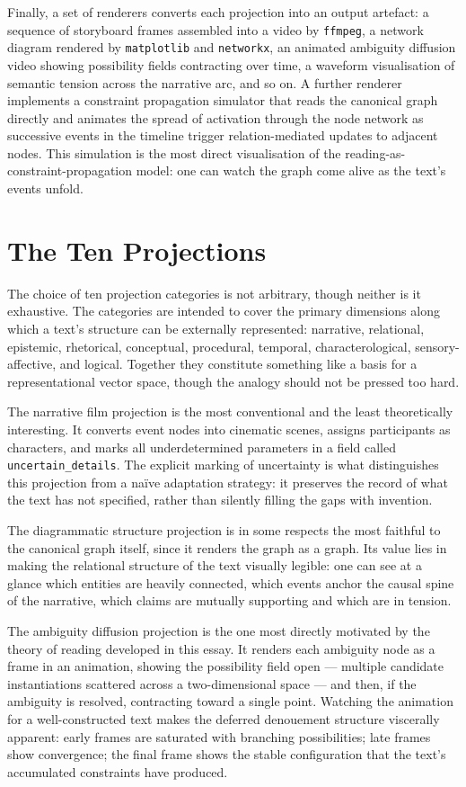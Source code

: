 \documentclass[12pt, a4paper]{article}
\begin{document}
Finally, a set of renderers converts each projection into an output artefact: a sequence of storyboard frames assembled into a video by \texttt{ffmpeg}, a network diagram rendered by \texttt{matplotlib} and \texttt{networkx}, an animated ambiguity diffusion video showing possibility fields contracting over time, a waveform visualisation of semantic tension across the narrative arc, and so on. A further renderer implements a constraint propagation simulator that reads the canonical graph directly and animates the spread of activation through the node network as successive events in the timeline trigger relation-mediated updates to adjacent nodes. This simulation is the most direct visualisation of the reading-as-constraint-propagation model: one can watch the graph come alive as the text's events unfold.

\section{The Ten Projections}

The choice of ten projection categories is not arbitrary, though neither is it exhaustive. The categories are intended to cover the primary dimensions along which a text's structure can be externally represented: narrative, relational, epistemic, rhetorical, conceptual, procedural, temporal, characterological, sensory-affective, and logical. Together they constitute something like a basis for a representational vector space, though the analogy should not be pressed too hard.

The narrative film projection is the most conventional and the least theoretically interesting. It converts event nodes into cinematic scenes, assigns participants as characters, and marks all underdetermined parameters in a field called \texttt{uncertain\_details}. The explicit marking of uncertainty is what distinguishes this projection from a naïve adaptation strategy: it preserves the record of what the text has not specified, rather than silently filling the gaps with invention.

The diagrammatic structure projection is in some respects the most faithful to the canonical graph itself, since it renders the graph as a graph. Its value lies in making the relational structure of the text visually legible: one can see at a glance which entities are heavily connected, which events anchor the causal spine of the narrative, which claims are mutually supporting and which are in tension.

The ambiguity diffusion projection is the one most directly motivated by the theory of reading developed in this essay. It renders each ambiguity node as a frame in an animation, showing the possibility field open — multiple candidate instantiations scattered across a two-dimensional space — and then, if the ambiguity is resolved, contracting toward a single point. Watching the animation for a well-constructed text makes the deferred denouement structure viscerally apparent: early frames are saturated with branching possibilities; late frames show convergence; the final frame shows the stable configuration that the text's accumulated constraints have produced.
\end{document}
